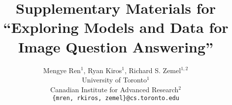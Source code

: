

\author{
Mengye Ren${}^1$, Ryan Kiros${}^1$, Richard S. Zemel${}^{1, 2}$\\
University of Toronto${}^1$\\
Canadian Institute for Advanced Research${}^2$\\
\texttt{\{mren, rkiros, zemel\}@cs.toronto.edu}
}

\title{Supplementary Materials for ``Exploring Models and Data for Image
Question Answering''}


\maketitle



